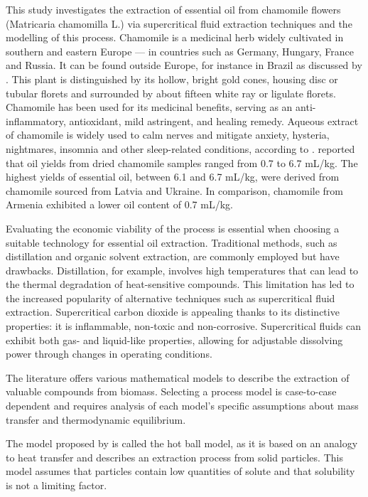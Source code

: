 \documentclass[../Article_Model_Parameters.tex]{subfiles}
\begin{document}
	
	This study investigates the extraction of essential oil from chamomile flowers (Matricaria chamomilla L.) via supercritical fluid extraction techniques and the modelling of this process. Chamomile is a medicinal herb widely cultivated in southern and eastern Europe — in countries such as Germany, Hungary, France and Russia. It can be found outside Europe, for instance in Brazil as discussed by \citet{Singh2011}. This plant is distinguished by its hollow, bright gold cones, housing disc or tubular florets and surrounded by about fifteen white ray or ligulate florets. Chamomile has been used for its medicinal benefits, serving as an anti-inflammatory, antioxidant, mild astringent, and healing remedy. Aqueous extract of chamomile is widely used to calm nerves and mitigate anxiety, hysteria, nightmares, insomnia and other sleep-related conditions, according to \citet{Srivastava2009}. \citet{Orav2010} reported that oil yields from dried chamomile samples ranged from 0.7 to 6.7 mL/kg. The highest yields of essential oil, between 6.1 and 6.7 mL/kg, were derived from chamomile sourced from Latvia and Ukraine. In comparison, chamomile from Armenia exhibited a lower oil content of 0.7 mL/kg.
	
	Evaluating the economic viability of the process is essential when choosing a suitable technology for essential oil extraction. Traditional methods, such as distillation and organic solvent extraction, are commonly employed but have drawbacks. Distillation, for example, involves high temperatures that can lead to the thermal degradation of heat-sensitive compounds. This limitation has led to the increased popularity of alternative techniques such as supercritical fluid extraction. Supercritical carbon dioxide is appealing thanks to its distinctive properties: it is inflammable, non-toxic and non-corrosive. Supercritical fluids can exhibit both gas- and liquid-like properties, allowing for adjustable dissolving power through changes in operating conditions.
	
	The literature offers various mathematical models to describe the extraction of valuable compounds from biomass. Selecting a process model is case-to-case dependent and requires analysis of each model's specific assumptions about mass transfer and thermodynamic equilibrium.
	
	The model proposed by \citet{Reverchon1993} is called the hot ball model, as it is based on an analogy to heat transfer and describes an extraction process from solid particles. This model assumes that particles contain low quantities of solute and that solubility is not a limiting factor.
	
\end{document}

